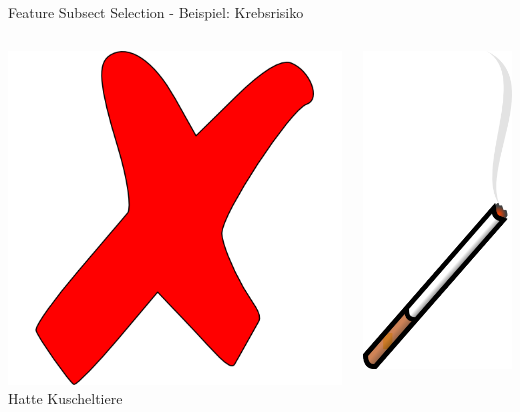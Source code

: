 \documentclass[xcolor=dvipsnames]{beamer}
\begin{document}
\begin{frame}{Feature Subsect Selection - Beispiel: Krebsrisiko}
\begin{columns}
\begin{column}{0.3\textwidth}
                     \includegraphics[width=(\textwidth / 3)]{img/cross.png}
                     Hatte Kuscheltiere
            \end{column}
            \begin{column}{0.3\textwidth}
                    \center
                     \includegraphics[width=(\textwidth / 4)]{img/cigarette.png}

\end{column}
\end{columns}
\end{frame}
\end{document}
